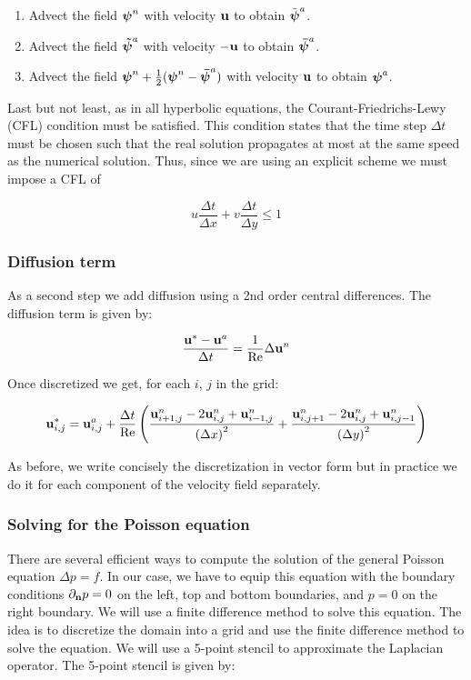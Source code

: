 \begin{enumerate}
  \item Advect the field $\boldsymbol{\mathrm{\psi}}^n$ with velocity $\boldsymbol{\mathrm{u}}$ to obtain $\tilde{\boldsymbol{\mathrm{\psi}}}^a$.
  \item Advect the field $\boldsymbol{\mathrm{\tilde{\psi}}}^a$ with velocity $-\boldsymbol{\mathrm{u}}$ to obtain $\boldsymbol{\mathrm{\bar{\psi}}}^a$.
  \item Advect the field $\boldsymbol{\mathrm{\psi}}^n + \frac{1}{2} (\boldsymbol{\mathrm{{\psi}}}^n - \boldsymbol{\mathrm{\bar{\psi}}}^a)$ with velocity $\boldsymbol{\mathrm{u}}$ to obtain $\boldsymbol{\mathrm{\psi}}^a$.
\end{enumerate}

Last but not least, as in all hyperbolic equations, the Courant-Friedrichs-Lewy (CFL) condition must be satisfied. This condition states that the time step $\Delta t$ must be chosen such that the real solution propagates at most at the same speed as the numerical solution. Thus, since we are using an explicit scheme we must impose a CFL of

$$u \frac{\Delta t}{\Delta x} +v \frac{\Delta t}{\Delta y}\leq 1$$

\subsubsection*{Diffusion term}
As a second step we add diffusion using a 2nd order central differences. The diffusion term is given by:

\begin{equation*}
  \frac{\boldsymbol{\mathrm{u}}^* - \boldsymbol{\mathrm{u}}^a}{\Delta t} = \frac{1}{\mathrm{Re}} \Delta \boldsymbol{\mathrm{u}}^n
\end{equation*}

Once discretized we get, for each $i$, $j$ in the grid:

\begin{equation*}
  \boldsymbol{\mathrm{u}}^*_{i,j} = \boldsymbol{\mathrm{u}}^a_{i,j} + \frac{\Delta t}{\mathrm{Re}}\left( \frac{\boldsymbol{\mathrm{u}}^n_{i+1,j} - 2\boldsymbol{\mathrm{u}}^n_{i,j} + \boldsymbol{\mathrm{u}}^n_{i-1,j}}{{(\Delta x)}^2} + \frac{\boldsymbol{\mathrm{u}}^n_{i,j+1} - 2\boldsymbol{\mathrm{u}}^n_{i,j} + \boldsymbol{\mathrm{u}}^n_{i,j-1}}{{(\Delta y)}^2}\right)
\end{equation*}

As before, we write concisely the discretization in vector form but in practice we do it for each component of the velocity field separately.

\subsubsection*{Solving for the Poisson equation}\label{sec: solvingPoisson}
There are several efficient ways to compute the solution of the general Poisson equation $\Delta p = f$. In our case, we have to equip this equation with the boundary conditions $\partial_{\boldsymbol{\mathrm{n}}}p=0$ on the left, top and bottom boundaries, and $p=0$ on the right boundary. We will use a finite difference method to solve this equation. The idea is to discretize the domain into a grid and use the finite difference method to solve the equation. We will use a 5-point stencil to approximate the Laplacian operator. The 5-point stencil is given by:

